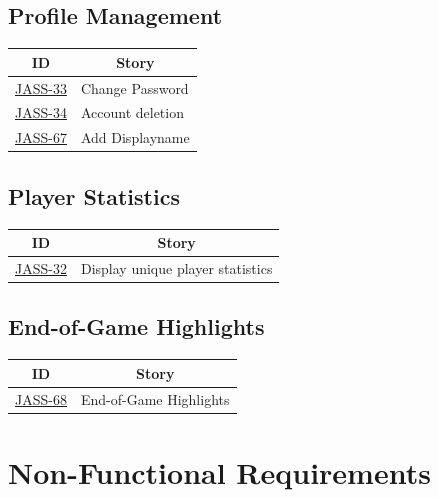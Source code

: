 \subsection{Profile Management}
\begin{tabular} { | m{1.75 cm} | m{5.25cm} | }
    \hline
    \multicolumn{1}{|c|}{ \textbf{ID}} & \multicolumn{1}{|c|}{ \textbf{Story} }  \\
    \hline
    \href{https://jasstracker-jira.atlassian.net/browse/JASS-33}{JASS-33} & Change Password \\
    \hline
    \href{https://jasstracker-jira.atlassian.net/browse/JASS-34}{JASS-34} & Account deletion \\
    \hline
    \href{https://jasstracker-jira.atlassian.net/browse/JASS-67}{JASS-67} & Add Displayname \\
    \hline
\end{tabular}

\subsection{Player Statistics}
\begin{tabular} { | m{1.75 cm} | m{5.25cm} | }
    \hline
    \multicolumn{1}{|c|}{ \textbf{ID}} & \multicolumn{1}{|c|}{ \textbf{Story} }  \\
    \hline
    \href{https://jasstracker-jira.atlassian.net/browse/JASS-32}{JASS-32} & Display unique player statistics \\
    \hline
\end{tabular}

\subsection{End-of-Game Highlights}
\begin{tabular} { | m{1.75 cm} | m{5.25cm} | }
    \hline
    \multicolumn{1}{|c|}{ \textbf{ID}} & \multicolumn{1}{|c|}{ \textbf{Story} } \\
    \hline
    \href{https://jasstracker-jira.atlassian.net/browse/JASS-68}{JASS-68} & End-of-Game Highlights \\
    \hline
\end{tabular}

\section {Non-Functional Requirements}

\renewcommand{\arraystretch}{1.5}


